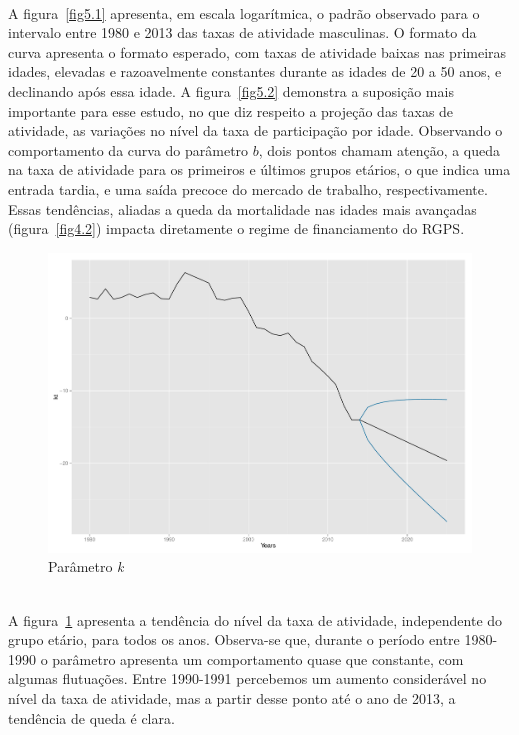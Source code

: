 \documentclass[12pt, 						%
			openright, 					%
			twoside,					%
			a4paper,x					%
			english,					%
			brazil]{abntex2}				%
\begin{document}
\begin{figure}[!htb]
\begin{subfigure}[b]{0.5\textwidth}
\begin{center}
		\end{center}
 		\end{subfigure}
	\end{figure} \\
	A figura~\ref{fig5.1} apresenta, em escala logarítmica, o padrão observado para o intervalo entre 1980 e 2013 das taxas de atividade masculinas. O formato da curva apresenta o formato esperado, com taxas de atividade baixas nas primeiras idades, elevadas e razoavelmente constantes durante as idades de 20 a 50 anos, e declinando após essa idade. A figura~\ref{fig5.2} demonstra a suposição mais importante para esse estudo, no que diz respeito a projeção das taxas de atividade, as variações no nível da taxa de participação por idade. Observando o comportamento da curva do parâmetro $b$, dois pontos chamam atenção, a queda na taxa de atividade para os primeiros e últimos grupos etários, o que indica uma entrada tardia, e uma saída precoce do mercado de trabalho, respectivamente. Essas tendências, aliadas a queda da mortalidade nas idades mais avançadas (figura~\ref{fig4.2}) impacta diretamente o regime de financiamento do RGPS.
	\begin{figure}[!htb]
	\caption{\label{fig6} Parâmetro \textit{k}}
		\begin{center}
			\includegraphics[scale = 0.35]{Graphs/LFPR_LC_kt_f.pdf}
		\end{center}
	\end{figure} \\
	A figura~\ref{fig6} apresenta a tendência do nível da taxa de atividade, independente do grupo etário, para todos os anos. Observa-se que, durante o período entre 1980-1990 o parâmetro apresenta um comportamento quase que constante, com algumas flutuações. Entre 1990-1991 percebemos um aumento considerável no nível da taxa de atividade, mas a partir desse ponto até o ano de 2013, a tendência de queda é clara. \\
\end{document}
